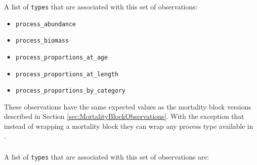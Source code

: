 \subsubsection{}

A list of \texttt{types} that are associated with this set of observations:

\begin{itemize}
	\item \texttt{process\_abundance}
	\item \texttt{process\_biomass}
	\item \texttt{process\_proportions\_at\_age}
	\item \texttt{process\_proportions\_at\_length}
	\item \texttt{process\_proportions\_by\_category}
\end{itemize}

These observations have the same expected values as the mortality block versions described in Section \ref{sec:MortalityBlockObservations}. With the exception that instead of wrapping a mortality block they can wrap any process type available in \CNAME.

\subsubsection{}

A list of \texttt{types} that are associated with this set of observations are:

